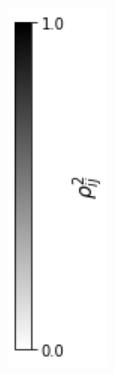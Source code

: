\begin{figure}
\begin{subfigure}{7mm}
  \includegraphics[width=1.0\linewidth]{colorbar}
\end{subfigure}%


\end{figure}
